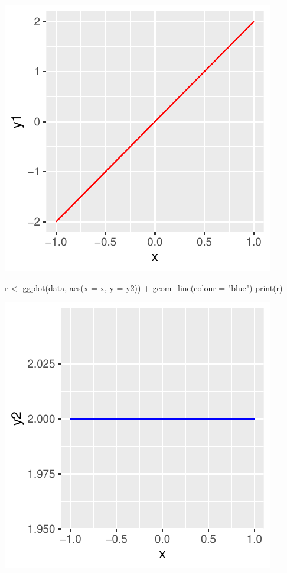 \documentclass[
]{book}
\newenvironment{Shaded}{\begin{snugshade}}{\end{snugshade}}
\newcommand{\AttributeTok}[1]{\textcolor[rgb]{0.77,0.63,0.00}{#1}}
\newcommand{\FunctionTok}[1]{\textcolor[rgb]{0.00,0.00,0.00}{#1}}
\newcommand{\NormalTok}[1]{#1}
\newcommand{\OtherTok}[1]{\textcolor[rgb]{0.56,0.35,0.01}{#1}}
\newcommand{\SpecialCharTok}[1]{\textcolor[rgb]{0.00,0.00,0.00}{#1}}
\newcommand{\StringTok}[1]{\textcolor[rgb]{0.31,0.60,0.02}{#1}}
\begin{document}
\includegraphics{bookdown-demo_files/figure-latex/unnamed-chunk-10-2.pdf}

\begin{Shaded}
\begin{Highlighting}[]
\NormalTok{r }\OtherTok{\textless{}{-}} \FunctionTok{ggplot}\NormalTok{(data, }\FunctionTok{aes}\NormalTok{(}\AttributeTok{x =}\NormalTok{ x, }\AttributeTok{y =}\NormalTok{ y2)) }\SpecialCharTok{+}
  \FunctionTok{geom\_line}\NormalTok{(}\AttributeTok{colour =} \StringTok{"blue"}\NormalTok{)}
\FunctionTok{print}\NormalTok{(r)}
\end{Highlighting}
\end{Shaded}

\includegraphics{bookdown-demo_files/figure-latex/unnamed-chunk-10-3.pdf}
\end{document}
